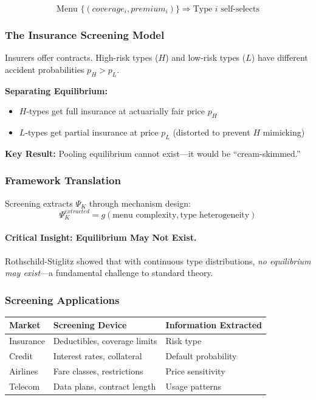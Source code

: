 \begin{equation}
\boxed{
\text{Menu } \{(coverage_i, premium_i)\} \Rightarrow \text{Type } i \text{ self-selects}
}
\label{eq:rs-screening}
\end{equation}

\subsubsection{The Insurance Screening Model}

Insurers offer contracts. High-risk types ($H$) and low-risk types ($L$) have 
different accident probabilities $p_H > p_L$.

\textbf{Separating Equilibrium:}
\begin{itemize}
    \item $H$-types get full insurance at actuarially fair price $p_H$
    \item $L$-types get partial insurance at price $p_L$ (distorted to prevent $H$ mimicking)
\end{itemize}

\textbf{Key Result:} Pooling equilibrium cannot exist—it would be ``cream-skimmed.''

\subsubsection{Framework Translation}

Screening extracts $\Psi_K$ through mechanism design:
\begin{equation}
\Psi_K^{extracted} = g(\text{menu complexity}, \text{type heterogeneity})
\end{equation}

\paragraph{Critical Insight: Equilibrium May Not Exist.}
Rothschild-Stiglitz showed that with continuous type distributions, 
\textit{no equilibrium may exist}—a fundamental challenge to standard theory.

\subsubsection{Screening Applications}

\begin{center}
\renewcommand{\arraystretch}{1.3}
\begin{tabular}{|l|l|l|}
\hline
\textbf{Market} & \textbf{Screening Device} & \textbf{Information Extracted} \\
\hline
Insurance & Deductibles, coverage limits & Risk type \\
Credit & Interest rates, collateral & Default probability \\
Airlines & Fare classes, restrictions & Price sensitivity \\
Telecom & Data plans, contract length & Usage patterns \\
\hline
\end{tabular}
\end{center}


